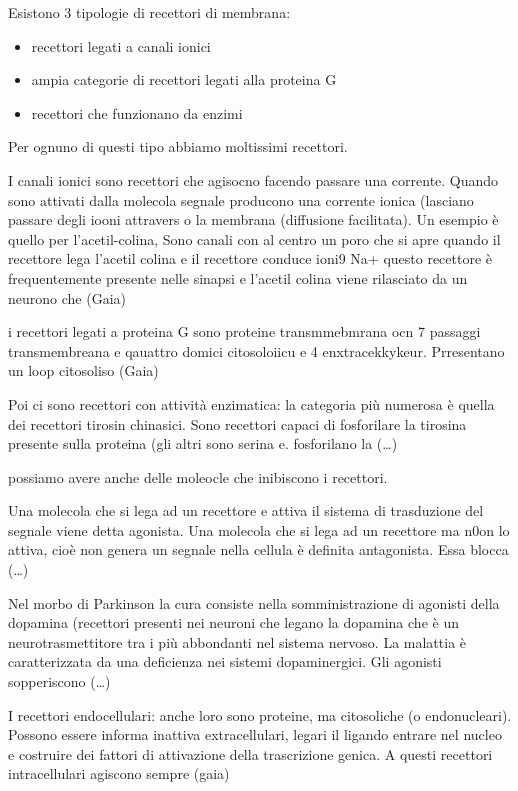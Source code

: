 \documentclass[]{article}
\begin{document}
Esistono 3 tipologie di recettori di membrana:

\begin{itemize}
\itemsep1pt\parskip0pt
\item
  recettori legati a canali ionici
\item
  ampia categorie di recettori legati alla proteina G
\item
  recettori che funzionano da enzimi
\end{itemize}

Per ognuno di questi tipo abbiamo moltissimi recettori.

I canali ionici sono recettori che agisocno facendo passare una
corrente. Quando sono attivati dalla molecola segnale producono una
corrente ionica (lasciano passare degli iooni attravers o la membrana
(diffusione facilitata). Un esempio è quello per l'acetil-colina, Sono
canali con al centro un poro che si apre quando il recettore lega
l'acetil colina e il recettore conduce ioni9 Na+ questo recettore è
frequentemente presente nelle sinapsi e l'acetil colina viene rilasciato
da un neurono che (Gaia)

i recettori legati a proteina G sono proteine transmmebmrana ocn 7
passaggi transmembreana e qauattro domici citosoloiicu e 4
enxtracekkykeur. Prresentano un loop citosoliso (Gaia)

Poi ci sono recettori con attività enzimatica: la categoria più numerosa
è quella dei recettori tirosin chinasici. Sono recettori capaci di
fosforilare la tirosina presente sulla proteina (gli altri sono serina
e. fosforilano la (\ldots{})

possiamo avere anche delle moleocle che inibiscono i recettori.

Una molecola che si lega ad un recettore e attiva il sistema di
trasduzione del segnale viene detta agonista. Una molecola che si lega
ad un recettore ma n0on lo attiva, cioè non genera un segnale nella
cellula è definita antagonista. Essa blocca (\ldots{})

Nel morbo di Parkinson la cura consiste nella somministrazione di
agonisti della dopamina (recettori presenti nei neuroni che legano la
dopamina che è un neurotrasmettitore tra i più abbondanti nel sistema
nervoso. La malattia è caratterizzata da una deficienza nei sistemi
dopaminergici. Gli agonisti sopperiscono (\ldots{})

I recettori endocellulari: anche loro sono proteine, ma citosoliche (o
endonucleari). Possono essere informa inattiva extracellulari, legari il
ligando entrare nel nucleo e costruire dei fattori di attivazione della
trascrizione genica. A questi recettori intracellulari agiscono sempre
(gaia)
\end{document}
